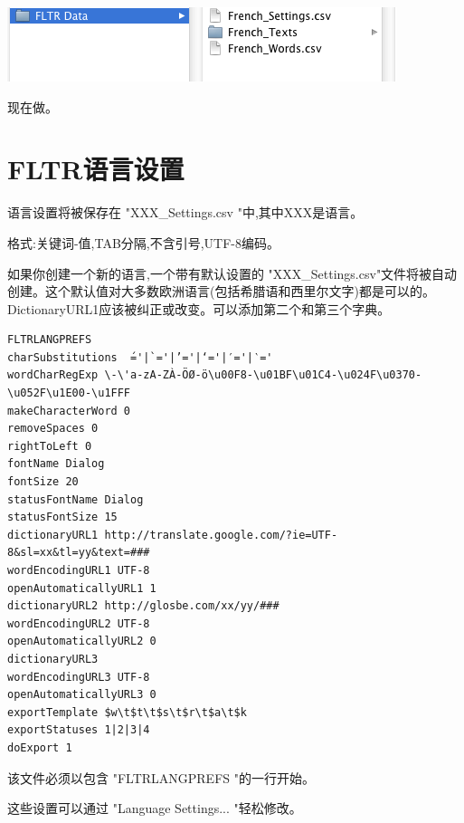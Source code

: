 \documentclass[cn,10pt,math=newtx,citestyle=gb7714-2015,bibstyle=gb7714-2015]{elegantbook}
\begin{document}
\includegraphics[scale=0.6]{image/images-026.png}

现在做。


\chapter{FLTR语言设置}
\label{FLTR语言设置}
语言设置将被保存在 "XXX\_Settings.csv "中,其中XXX是语言。

格式:关键词-值,TAB分隔,不含引号,UTF-8编码。

如果你创建一个新的语言,一个带有默认设置的 "XXX\_Settings.csv"文件将被自动创建。这个默认值对大多数欧洲语言(包括希腊语和西里尔文字)都是可以的。
DictionaryURL1应该被纠正或改变。可以添加第二个和第三个字典。

\lstset{showstringspaces=false} %
\begin{lstlisting}
FLTRLANGPREFS
charSubstitutions  ́='|`='|’='|‘='|′='|‵='
wordCharRegExp \-\'a-zA-ZÀ-ÖØ-ö\u00F8-\u01BF\u01C4-\u024F\u0370-\u052F\u1E00-\u1FFF
makeCharacterWord 0
removeSpaces 0
rightToLeft 0
fontName Dialog
fontSize 20
statusFontName Dialog
statusFontSize 15
dictionaryURL1 http://translate.google.com/?ie=UTF-8&sl=xx&tl=yy&text=###
wordEncodingURL1 UTF-8
openAutomaticallyURL1 1
dictionaryURL2 http://glosbe.com/xx/yy/###
wordEncodingURL2 UTF-8
openAutomaticallyURL2 0
dictionaryURL3
wordEncodingURL3 UTF-8
openAutomaticallyURL3 0
exportTemplate $w\t$t\t$s\t$r\t$a\t$k
exportStatuses 1|2|3|4
doExport 1
\end{lstlisting}

该文件必须以包含 "FLTRLANGPREFS "的一行开始。



这些设置可以通过 "Language Settings... "轻松修改。
\end{document}
